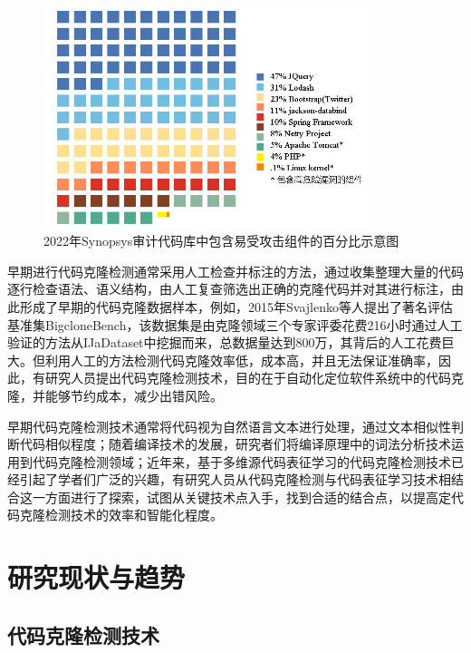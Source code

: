 \begin{figure}[H]
    \centering
    \includegraphics[width=0.85\textwidth]{figures/assembly}
    \caption{2022年Synopsys审计代码库中包含易受攻击组件的百分比示意图}
    \label{fig:assembly}
\end{figure}

早期进行代码克隆检测通常采用人工检查并标注的方法，通过收集整理大量的代码逐行检查语法、语义结构，由人工复查筛选出正确的克隆代码并对其进行标注，由此形成了早期的代码克隆数据样本，例如，2015年Svajlenko\cite{7332459}等人提出了著名评估基准集BigcloneBench，该数据集是由克隆领域三个专家评委花费216小时通过人工验证的方法从IJaDataset\cite{IJaDataset2.0}中挖掘而来，总数据量达到800万，其背后的人工花费巨大。但利用人工的方法检测代码克隆效率低，成本高，并且无法保证准确率\cite{7965429}，因此，有研究人员提出代码克隆检测技术，目的在于自动化定位软件系统中的代码克隆，并能够节约成本，减少出错风险\cite{Yang2015ClassificationMF}。

早期代码克隆检测技术通常将代码视为自然语言文本进行处理，通过文本相似性判断代码相似程度；随着编译技术的发展，研究者们将编译原理中的词法分析技术运用到代码克隆检测领域；近年来，基于多维源代码表征学习的代码克隆检测技术已经引起了学者们广泛的兴趣，有研究人员从代码克隆检测与代码表征学习技术相结合这一方面进行了探索，试图从关键技术点入手，找到合适的结合点，以提高定代码克隆检测技术的效率和智能化程度。


\section{研究现状与趋势}
\label{sec:status}

\subsection{代码克隆检测技术}
\label{subsec:Code clone detection}

